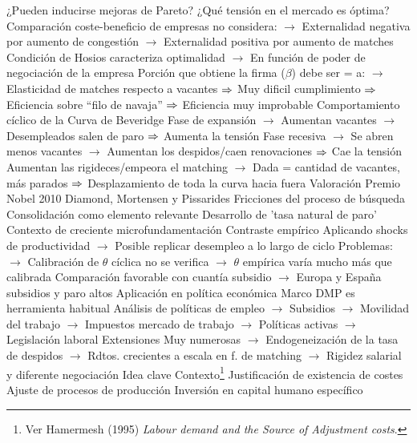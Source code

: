 \documentclass{nuevotema}
\begin{document}
\begin{esquemal}
				\4[] ¿Pueden inducirse mejoras de Pareto?
				\4[] ¿Qué tensión en el mercado es óptima?
				\4[] Comparación coste-beneficio de empresas no considera:
				\4[] $\to$ Externalidad negativa por aumento de congestión
				\4[] $\to$ Externalidad positiva por aumento de matches
				\4[] Condición de Hosios caracteriza optimalidad
				\4[] $\to$ En función de poder de negociación de la empresa
				\4[] Porción que obtiene la firma ($\beta$) debe ser = a:
				\4[] $\to$ Elasticidad de matches respecto a vacantes
				\4[] $\Rightarrow$ Muy dificil cumplimiento
				\4[] $\Rightarrow$ Eficiencia sobre ``filo de navaja''
				\4[] $\Rightarrow$ Eficiencia muy improbable
				\4 Comportamiento cíclico de la Curva de Beveridge
				\4[] Fase de expansión
				\4[] $\to$ Aumentan vacantes
				\4[] $\to$ Desempleados salen de paro
				\4[] $\Rightarrow$ Aumenta la tensión
				\4[] Fase recesiva
				\4[] $\to$ Se abren menos vacantes
				\4[] $\to$ Aumentan los despidos/caen renovaciones
				\4[] $\Rightarrow$ Cae la tensión
				\4[] Aumentan las rigideces/empeora el matching
				\4[] $\to$ Dada = cantidad de vacantes, más parados
				\4[] $\Rightarrow$ Desplazamiento de toda la curva hacia fuera
			\3 Valoración
				\4 Premio Nobel 2010
				\4[] Diamond, Mortensen y Pissarides
				\4 Fricciones del proceso de búsqueda
				\4[] Consolidación como elemento relevante
				\4[] Desarrollo de 'tasa natural de paro'
				\4[] Contexto de creciente microfundamentación
				\4 Contraste empírico
				\4[] Aplicando shocks de productividad
				\4[] $\to$ Posible replicar desempleo a lo largo de ciclo
				\4[] Problemas:
				\4[] $\to$ Calibración de $\theta$ cíclica no se verifica
				\4[] $\to$ $\theta$ empírica varía mucho más que calibrada
				\4[] Comparación favorable con cuantía subsidio
				\4[] $\to$ Europa y España subsidios y paro altos
				\4 Aplicación en política económica
				\4[] Marco DMP es herramienta habitual
				\4[] Análisis de políticas de empleo
				\4[] $\to$ Subsidios
				\4[] $\to$ Movilidad del trabajo
				\4[] $\to$ Impuestos mercado de trabajo
				\4[] $\to$ Políticas activas
				\4[] $\to$ Legislación laboral
				\4 Extensiones
				\4[] Muy numerosas
				\4[] $\to$ Endogeneización de la tasa de despidos
				\4[] $\to$ Rdtos. crecientes a escala en f. de matching
				\4[] $\to$ Rigidez salarial y diferente negociación
	\1 
		\2 Idea clave
			\3 Contexto\footnote{Ver Hamermesh (1995) \textit{Labour demand and the Source of Adjustment costs}.}
				\4 Justificación de existencia de costes
				\4[] Ajuste de procesos de producción
				\4[] Inversión en capital humano específico

\end{esquemal}
\end{document}
